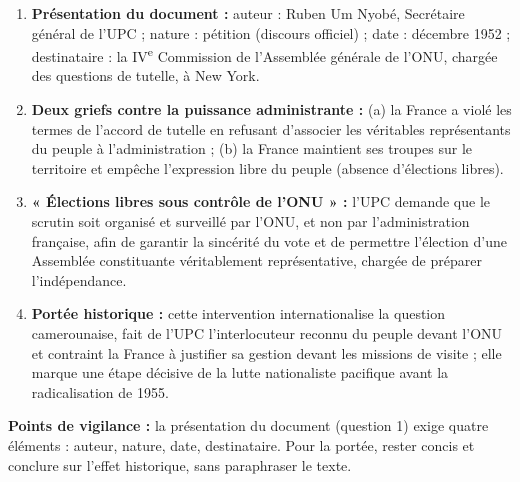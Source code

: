 \documentclass[11pt]{article}
\begin{document}
\begin{corrige}
\begin{enumerate}
\item \textbf{Présentation du document :} auteur : Ruben Um Nyobé, Secrétaire général de l'UPC ; nature : pétition (discours officiel) ; date : décembre 1952 ; destinataire : la IV\textsuperscript{e} Commission de l'Assemblée générale de l'ONU, chargée des questions de tutelle, à New York.
\item \textbf{Deux griefs contre la puissance administrante :} (a) la France a violé les termes de l'accord de tutelle en refusant d'associer les véritables représentants du peuple à l'administration ; (b) la France maintient ses troupes sur le territoire et empêche l'expression libre du peuple (absence d'élections libres).
\item \textbf{« Élections libres sous contrôle de l'ONU » :} l'UPC demande que le scrutin soit organisé et surveillé par l'ONU, et non par l'administration française, afin de garantir la sincérité du vote et de permettre l'élection d'une Assemblée constituante véritablement représentative, chargée de préparer l'indépendance.
\item \textbf{Portée historique :} cette intervention internationalise la question camerounaise, fait de l'UPC l'interlocuteur reconnu du peuple devant l'ONU et contraint la France à justifier sa gestion devant les missions de visite ; elle marque une étape décisive de la lutte nationaliste pacifique avant la radicalisation de 1955.
\end{enumerate}
\textbf{Points de vigilance :} la présentation du document (question 1) exige quatre éléments : auteur, nature, date, destinataire. Pour la portée, rester concis et conclure sur l'effet historique, sans paraphraser le texte.
\end{corrige}
\end{document}
